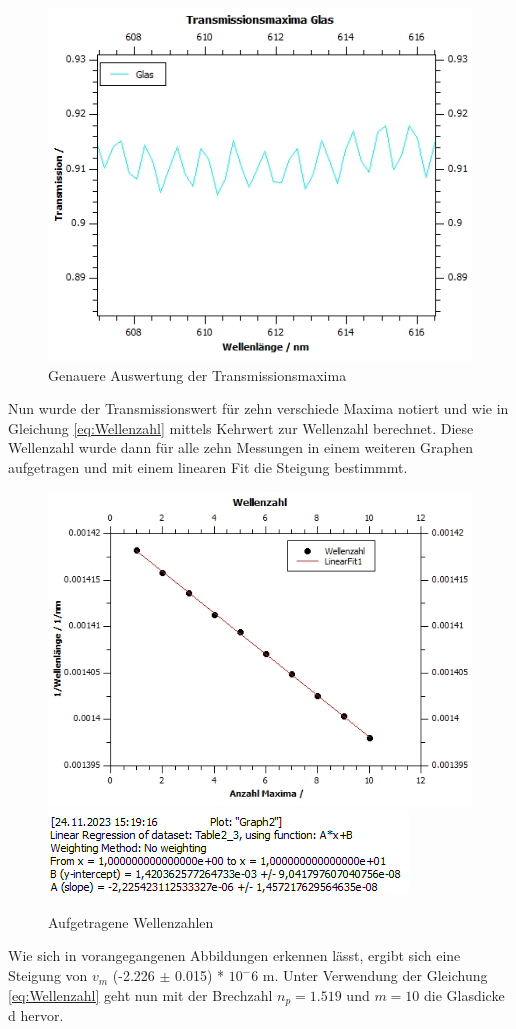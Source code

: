\documentclass[12pt,a4paper,twoside]{article}
\begin{document}
\begin{figure}[H]
    \centering
    \includegraphics[width=0.6\linewidth]{nudes/qti-Transmissionsmaxima-Glas.jpg}
    \caption{Genauere Auswertung der Transmissionsmaxima}
    \label{fig:Transmissionsmaxima}
\end{figure}

\noindent
Nun wurde der Transmissionswert für zehn verschiede Maxima notiert und wie in Gleichung \ref{eq:Wellenzahl} mittels Kehrwert zur Wellenzahl berechnet.
Diese Wellenzahl wurde dann für alle zehn Messungen in einem weiteren Graphen aufgetragen und mit einem linearen Fit die Steigung bestimmmt.

\begin{figure}[H]
    \centering
    \includegraphics[width=0.4\linewidth]{nudes/qti-SteigungWellenzahl.jpg}
    \includegraphics[width=0.4\linewidth]{nudes/WellenzahlSteigung.png}
    \caption{Aufgetragene Wellenzahlen}
    \label{fig:WellenzahlSteigung}
\end{figure}

\noindent
Wie sich in vorangegangenen Abbildungen erkennen lässt, ergibt sich eine Steigung von $v_{m}$ (-2.226 $\pm$ 0.015) * $10^-6$ m.
Unter Verwendung der Gleichung \ref{eq:Wellenzahl} geht nun mit der Brechzahl $n_{p}=1.519$ und $m=10$ die Glasdicke d hervor. \newline
\end{document}
